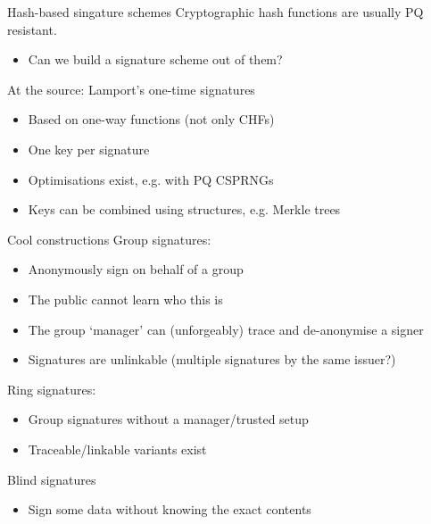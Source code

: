 \begin{frame}{Hash-based singature schemes}
  \pause
  Cryptographic hash functions are usually PQ resistant.
  \begin{itemize}
    \item Can we build a signature scheme out of them?
  \end{itemize}

  \vspace*{1em}

  \pause
  At the source: Lamport's one-time signatures
  \begin{itemize}[<+(1)->]
    \item Based on one-way functions (not only CHFs)
    \item One key per signature
    \item Optimisations exist, e.g. with PQ CSPRNGs
    \item Keys can be combined using structures, e.g. Merkle trees
  \end{itemize}
\end{frame}

\begin{frame}{Cool constructions}
  \pause
  Group signatures:
  \begin{itemize}[<+(1)->]
    \item Anonymously sign on behalf of a group
    \item The public cannot learn who this is
    \item The group `manager' can (unforgeably) trace and de-anonymise a signer
    \item Signatures are unlinkable (multiple signatures by the same issuer?)
  \end{itemize}

  \pause
  Ring signatures:
  \begin{itemize}[<+(1)->]
    \item Group signatures without a manager/trusted setup
    \item Traceable/linkable variants exist
  \end{itemize}

  \pause
  Blind signatures
  \begin{itemize}[<+(1)->]
    \item Sign some data without knowing the exact contents
  \end{itemize}
\end{frame}

